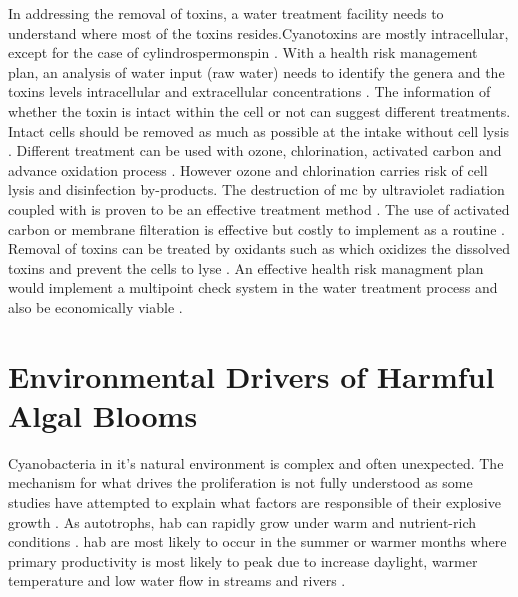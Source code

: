 In addressing the removal of toxins, a water treatment facility needs to understand where most of the toxins resides.Cyanotoxins are mostly intracellular, except for the case of cylindrospermonspin \cite{rastogi_cyanotoxin-microcystins:_2014}.
With a health risk management plan, an analysis of water input (raw water) needs to identify the genera and the toxins levels intracellular and extracellular concentrations \cite{saoudi_management_2017}. The information of whether the toxin is intact within the cell or not can suggest different treatments. Intact cells should be removed as much as possible at the intake without cell lysis \cite{westrick_review_2010}. Different treatment can be used with ozone, chlorination, activated carbon and advance oxidation process \cite{koreiviene_cyanotoxin_2014, westrick_cyanotoxin_2018}. However ozone and chlorination carries risk of cell lysis and disinfection by-products. The destruction of \gls{mc} by ultraviolet radiation coupled with  is proven to be an effective treatment method \cite{he_efficient_2012}. The use of activated carbon or membrane filteration is effective but costly to implement as a routine \cite{koreiviene_cyanotoxin_2014}. Removal of toxins can be treated by oxidants such as  which oxidizes the dissolved toxins and prevent the cells to lyse \cite{westrick_cyanotoxin_2018}. An effective health risk managment plan would implement a multipoint check system in the water treatment process and also be economically viable \cite{westrick_review_2010,saoudi_management_2017}.

\section{Environmental Drivers of Harmful Algal Blooms}
Cyanobacteria in it's natural environment is complex and often unexpected. The mechanism for what drives the proliferation is not fully understood as some studies have attempted to explain what factors are responsible of their explosive growth \cite{dittmann_cyanobacterial_2012, noauthor_human_2012}. As autotrophs, \gls{hab} can rapidly grow under warm and nutrient-rich conditions \cite{rastogi_cyanotoxin-microcystins:_2014}. \gls{hab} are most likely to occur in the summer or warmer months where primary productivity is most likely to peak due to increase daylight, warmer temperature and low water flow in streams and rivers \cite{vannote_river_1980,chapra_climate_2017-2}.

